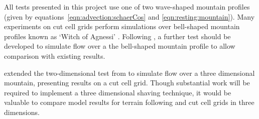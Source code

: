 All tests presented in this project use one of two wave-shaped mountain profiles (given by equations~\ref{eqn:advection:schaerCos} and \ref{eqn:resting:mountain}).  Many experiments on cut cell grids perform simulations over bell-shaped mountain profiles known as `Witch of Agnessi' \parencites{steppeler2002}{rosatti2005}{klein2009}{jebens2011}.  Following \textcite{gallus-klemp2000}, a further test should be developed to simulate flow over a the bell-shaped mountain profile to allow comparison with existing results.

\textcite{lock2012} extended the two-dimensional test from \textcite{gallus-klemp2000} to simulate flow over a three dimensional mountain, presenting results on a cut cell grid.  Though substantial work will be required to implement a three dimensional shaving technique, it would be valuable to compare model results for terrain following and cut cell grids in three dimensions.

